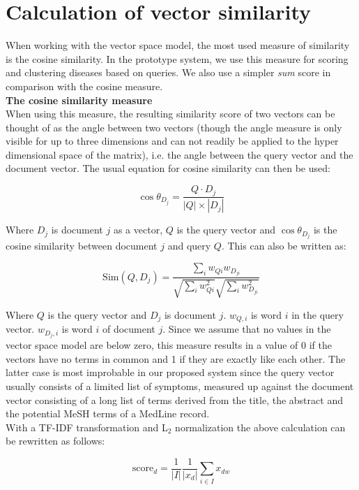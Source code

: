 \section{Calculation of vector similarity\label{VectorSimilarity}}

When working with the vector space model, the most used measure of
similarity is the cosine similarity. In the prototype system, we use
this measure for scoring and clustering diseases based on queries. We
also use a simpler \textit{sum} score in comparison with the cosine
measure.\\

\textbf{The cosine similarity measure} \\ 
When using this measure, the resulting similarity score of two vectors
can be thought of as the angle between two vectors (though the angle
measure is only visible for up to three dimensions and can not readily
be applied to the hyper dimensional space of the matrix), i.e. the
angle between the query vector and the document vector. The usual
equation for cosine similarity can then be used:

\[
\cos \theta_{D_j} = \frac{Q \cdot D_j}{|Q| \times |D_j|}
\]

Where $D_j$ is document $j$ as a vector, $Q$ is the query vector and
$\cos \theta_{D_{j}}$ is the cosine similarity between document $j$ and
query $Q$. This can also be written as: 

\[
\textrm{Sim}(Q,D_{j}) = \frac{\sum_{i}w_{Qi} w_{D_{ji}}}{\sqrt{\sum_{i}w_{Qi}^{2}} \sqrt{\sum_{i}w_{D_{ji}}^{2}}}
\]

Where $Q$ is the query vector and $D_j$ is document $j$. $w_{Q,i}$ is
word $i$ in the query vector. $w_{D_{j},i}$ is word $i$ of document
$j$. Since we assume that no values in the vector space model are
below zero, this measure results in a value of 0 if the vectors have
no terms in common and 1 if they are exactly like each other. The
latter case is most improbable in our proposed system since the query
vector usually consists of a limited list of symptoms, measured up
against the document vector consisting of a long list of terms derived
from the title, the abstract and the potential MeSH terms of a MedLine
record. \\

With a TF-IDF transformation and L$_2$ normalization the above
calculation can be rewritten as follows: 

\[
\textrm{score}_{d} = \frac{1}{|I|}\frac{1}{|x_{d}|} \sum_{i \in I} x_{dw}
\]


